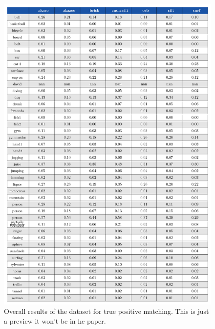 \begin{figure}[t]
\centerline{%
		\includegraphics[width=0.98\linewidth]{tables/test.pdf}}
    \vspace{-2mm} 
	\caption{Overall results of the dataset for true positive matching. This is just a preview it won't be in he paper.}
	\label{fig:learnvsno}
\end{figure}